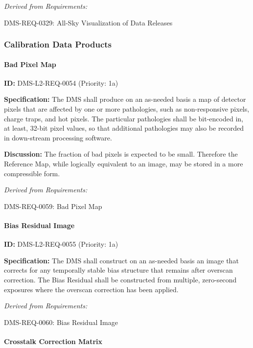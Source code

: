 \documentclass[SE,toc,lsstdraft]{lsstdoc}
\begin{document}
\emph{Derived from Requirements:}

DMS-REQ-0329:
All-Sky Visualization of Data Releases \newline

\subsubsection{Calibration Data Products}

\paragraph{Bad Pixel Map}\hfill  %

\label{DMS-L2-REQ-0054}
\textbf{ID:} DMS-L2-REQ-0054 (Priority: 1a)

\textbf{Specification: }The DMS shall produce on an as-needed basis a map of detector pixels that are affected by one or more pathologies, such as non-responsive pixels, charge traps, and hot pixels. The particular pathologies shall be bit-encoded in, at least, 32-bit pixel values, so that additional pathologies may also be recorded in down-stream processing software.

\textbf{Discussion:} The fraction of bad pixels is expected to be small. Therefore the Reference Map, while logically equivalent to an image, may be stored in a more compressible form.

\emph{Derived from Requirements:}

DMS-REQ-0059:
Bad Pixel Map \newline

\paragraph{Bias Residual Image}\hfill  %

\label{DMS-L2-REQ-0055}
\textbf{ID:} DMS-L2-REQ-0055 (Priority: 1a)

\textbf{Specification:} The DMS shall construct on an as-needed basis an image that corrects for any temporally stable bias structure that remains after overscan correction. The Bias Residual shall be constructed from multiple, zero-second exposures where the overscan correction has been applied.

\emph{Derived from Requirements:}

DMS-REQ-0060:
Bias Residual Image \newline

\paragraph{Crosstalk Correction Matrix}\hfill  %
\end{document}
